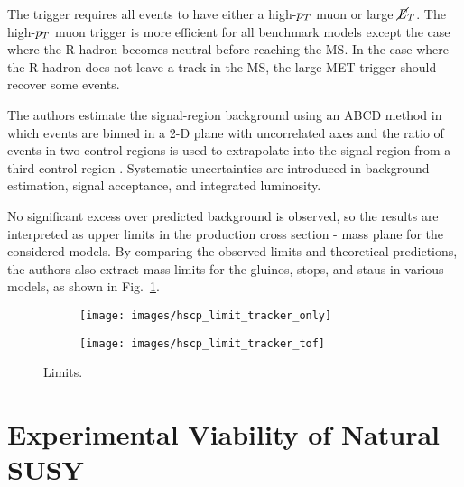 \documentclass[12pt]{article}
\begin{document}
        The trigger requires all events to have either a high-$p_T$ muon or large $\cancel{\it{E}}_{T}$. The high-$p_T$ muon trigger is more efficient for all benchmark models except the case where the R-hadron becomes neutral before reaching the MS. In the case where the R-hadron does not leave a track in the MS, the large MET trigger should recover some events.  

        The authors estimate the signal-region background using an ABCD method in which events are binned in a 2-D plane with uncorrelated axes and the ratio of events in two control regions is used to extrapolate into the signal region from a third control region . Systematic uncertainties are introduced in background estimation, signal acceptance, and integrated luminosity.

        No significant excess over predicted background is observed, so the results are interpreted as upper limits in the production cross section - mass plane for the considered models. By comparing the observed limits and theoretical predictions, the authors also extract mass limits for the gluinos, stops, and staus in various models, as shown in Fig.~\ref{hscp_limits}.

        \noindent \begin{figure}[htbp] \begin{center}
        \begin{subfigure}[htbp]{0.45\textwidth} \begin{center}
        \texttt{[image: images/hscp\_limit\_tracker\_only]}
        \end{center} \end{subfigure}
        \begin{subfigure}[htbp]{0.45\textwidth} \begin{center}
        \texttt{[image: images/hscp\_limit\_tracker\_tof]}
        \end{center} \end{subfigure}
        \caption{Limits.}
        \label{hscp_limits}
        \end{center} \end{figure}

\section{Experimental Viability of Natural SUSY}
      
\end{document}
